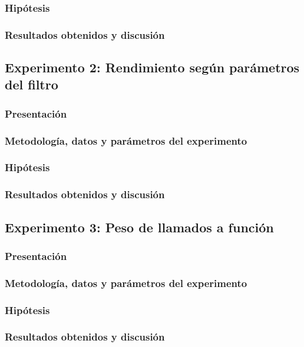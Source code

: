         \subsubsection*{Hipótesis}

        \subsubsection*{Resultados obtenidos y discusión}

    \subsection{Experimento 2: Rendimiento según parámetros del filtro}

        \subsubsection*{Presentación}

        \subsubsection*{Metodología, datos y parámetros del experimento}

        \subsubsection*{Hipótesis}

        \subsubsection*{Resultados obtenidos y discusión}

    \subsection{Experimento 3: Peso de llamados a función}

        \subsubsection*{Presentación}

        \subsubsection*{Metodología, datos y parámetros del experimento}

        \subsubsection*{Hipótesis}

        \subsubsection*{Resultados obtenidos y discusión}

